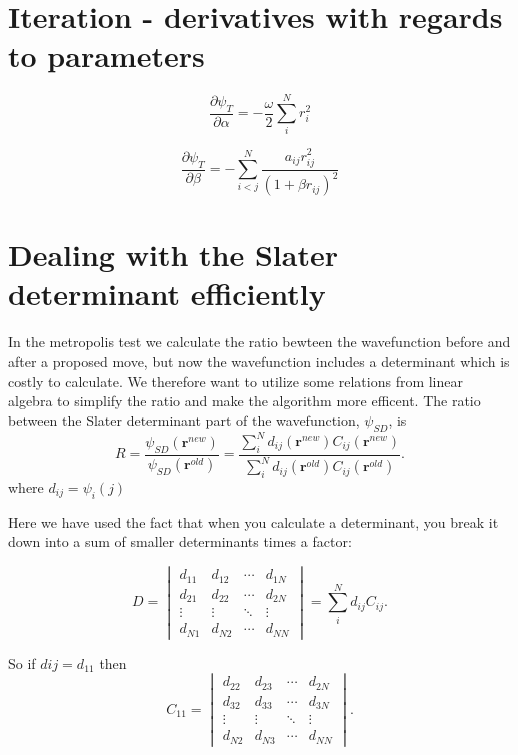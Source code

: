 \section{Iteration - derivatives with regards to parameters}

\begin{equation}
\frac{\partial \psi_T}{\partial \alpha} = -\frac{\omega}{2}\sum_i^N r_i^2
\end{equation}

\begin{equation}
\frac{\partial \psi_T}{\partial \beta} = - \sum_{i<j}^N \frac{a_{ij}r_{ij}^2}{(1+\beta r_{ij})^2}
\end{equation}

\section{Dealing with the Slater determinant efficiently}

In the metropolis test we calculate the ratio bewteen the wavefunction before and after a proposed move, but now the wavefunction includes a determinant which is costly to calculate. We therefore want to utilize some relations from linear algebra to simplify the ratio and make the algorithm more efficent. The ratio between the Slater determinant part of the wavefunction, $\psi_{SD}$, is
\begin{equation}\label{eq:metropolis_ratio}
R = \frac{\psi_{SD}(\bm{r}^{new})}{\psi_{SD}(\bm{r}^{old})} = \frac{\sum_i^N d_{ij}(\bm{r}^{new})C_{ij}(\bm{r}^{new})}{\sum_i^N d_{ij}(\bm{r}^{old})C_{ij}(\bm{r}^{old})}.
\end{equation} where $d_{ij} = \psi_i(j)$

Here we have used the fact that when you calculate a determinant, you break it down into a sum of smaller determinants times a factor:

\begin{equation*}
D = 
 \begin{vmatrix}
  d_{11} & d_{12} & \cdots & d_{1N} \\
  d_{21} & d_{22} & \cdots & d_{2N} \\
  \vdots  & \vdots  & \ddots & \vdots  \\
  d_{N1} & d_{N2} & \cdots & d_{NN} 
\end{vmatrix} = \sum_i^N d_{ij}C_{ij}. %
\end{equation*}

So if $d{ij} = d_{11}$ then 
\begin{equation*}
C_{11} = 
 \begin{vmatrix}
 d_{22} & d_{23} & \cdots & d_{2N} \\
  d_{32} & d_{33} & \cdots & d_{3N} \\
  \vdots  & \vdots  & \ddots & \vdots  \\
  d_{N2} & d_{N3} & \cdots & d_{NN} 
 \end{vmatrix}.
\end{equation*}

